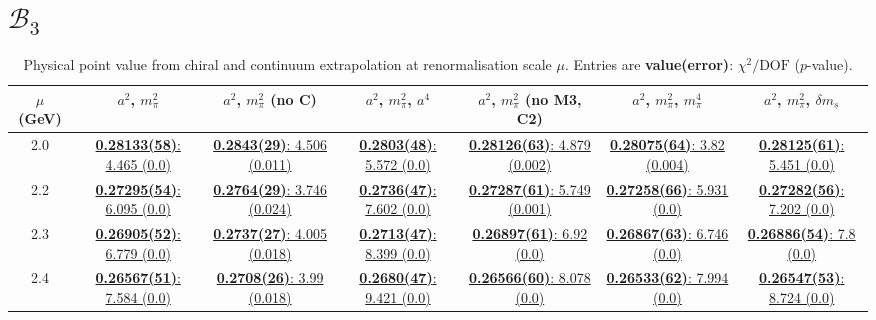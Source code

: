 \documentclass[12pt]{extarticle}
\begin{document}
\section{$\mathcal{B}_3$}
\begin{table}[h!]
\begin{center}
\begin{tabular}{|c|c|c|c|c|c|c|}
\hline
$\mu$ (GeV) & $a^2$, $m_\pi^2$& $a^2$, $m_\pi^2$ (no C)& $a^2$, $m_\pi^2$, $a^4$& $a^2$, $m_\pi^2$ (no M3, C2)& $a^2$, $m_\pi^2$, $m_\pi^4$& $a^2$, $m_\pi^2$, $\delta m_s$\\
\hline
2.0& \hyperlink{SSmPP/SUSY/a2m2_20.pdf.1}{\textbf{0.28133(58)}: 4.465 (0.0)} & \hyperlink{SSmPP/SUSY/a2m2noC_20.pdf.1}{\textbf{0.2843(29)}: 4.506 (0.011)} & \hyperlink{SSmPP/SUSY/a2a4m2_20.pdf.1}{\textbf{0.2803(48)}: 5.572 (0.0)} & \hyperlink{SSmPP/SUSY/a2m2mcut_20.pdf.1}{\textbf{0.28126(63)}: 4.879 (0.002)} & \hyperlink{SSmPP/SUSY/a2m2m4_20.pdf.1}{\textbf{0.28075(64)}: 3.82 (0.004)} & \hyperlink{SSmPP/SUSY/a2m2delm_20.pdf.1}{\textbf{0.28125(61)}: 5.451 (0.0)}\\
2.2& \hyperlink{SSmPP/SUSY/a2m2_22.pdf.1}{\textbf{0.27295(54)}: 6.095 (0.0)} & \hyperlink{SSmPP/SUSY/a2m2noC_22.pdf.1}{\textbf{0.2764(29)}: 3.746 (0.024)} & \hyperlink{SSmPP/SUSY/a2a4m2_22.pdf.1}{\textbf{0.2736(47)}: 7.602 (0.0)} & \hyperlink{SSmPP/SUSY/a2m2mcut_22.pdf.1}{\textbf{0.27287(61)}: 5.749 (0.001)} & \hyperlink{SSmPP/SUSY/a2m2m4_22.pdf.1}{\textbf{0.27258(66)}: 5.931 (0.0)} & \hyperlink{SSmPP/SUSY/a2m2delm_22.pdf.1}{\textbf{0.27282(56)}: 7.202 (0.0)}\\
2.3& \hyperlink{SSmPP/SUSY/a2m2_23.pdf.1}{\textbf{0.26905(52)}: 6.779 (0.0)} & \hyperlink{SSmPP/SUSY/a2m2noC_23.pdf.1}{\textbf{0.2737(27)}: 4.005 (0.018)} & \hyperlink{SSmPP/SUSY/a2a4m2_23.pdf.1}{\textbf{0.2713(47)}: 8.399 (0.0)} & \hyperlink{SSmPP/SUSY/a2m2mcut_23.pdf.1}{\textbf{0.26897(61)}: 6.92 (0.0)} & \hyperlink{SSmPP/SUSY/a2m2m4_23.pdf.1}{\textbf{0.26867(63)}: 6.746 (0.0)} & \hyperlink{SSmPP/SUSY/a2m2delm_23.pdf.1}{\textbf{0.26886(54)}: 7.8 (0.0)}\\
2.4& \hyperlink{SSmPP/SUSY/a2m2_24.pdf.1}{\textbf{0.26567(51)}: 7.584 (0.0)} & \hyperlink{SSmPP/SUSY/a2m2noC_24.pdf.1}{\textbf{0.2708(26)}: 3.99 (0.018)} & \hyperlink{SSmPP/SUSY/a2a4m2_24.pdf.1}{\textbf{0.2680(47)}: 9.421 (0.0)} & \hyperlink{SSmPP/SUSY/a2m2mcut_24.pdf.1}{\textbf{0.26566(60)}: 8.078 (0.0)} & \hyperlink{SSmPP/SUSY/a2m2m4_24.pdf.1}{\textbf{0.26533(62)}: 7.994 (0.0)} & \hyperlink{SSmPP/SUSY/a2m2delm_24.pdf.1}{\textbf{0.26547(53)}: 8.724 (0.0)}\\
\hline
\end{tabular}
\caption{Physical point value from chiral and continuum extrapolation at renormalisation scale $\mu$. Entries are \textbf{value(error)}: $\chi^2/\text{DOF}$ ($p$-value).}
\end{center}
\end{table}
\end{document}
